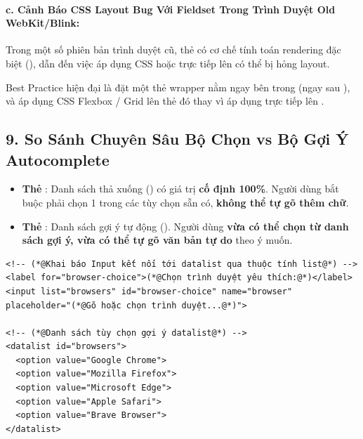 \paragraph{c. Cảnh Báo CSS Layout Bug Với Fieldset Trong Trình Duyệt Old WebKit/Blink:}
Trong một số phiên bản trình duyệt cũ, thẻ  có cơ chế tính toán rendering đặc biệt (), dẫn đến việc áp dụng CSS  hoặc  trực tiếp lên  có thể bị hỏng layout.
\begin{tipBox}
Best Practice hiện đại là đặt một thẻ wrapper  nằm ngay bên trong  (ngay sau ), và áp dụng CSS Flexbox / Grid lên thẻ  đó thay vì áp dụng trực tiếp lên .
\end{tipBox}

\subsection{9. So Sánh Chuyên Sâu Bộ Chọn  vs Bộ Gợi Ý Autocomplete }

\begin{conceptBox}
\begin{itemize}[leftmargin=1.5em, itemsep=3pt, parsep=0pt]
    \item \textbf{Thẻ }: Danh sách thả xuống () có giá trị \textbf{cố định 100\%}. Người dùng bắt buộc phải chọn 1 trong các tùy chọn sẵn có, \textbf{không thể tự gõ thêm chữ}.
    \item \textbf{Thẻ }: Danh sách gợi ý tự động (). Người dùng \textbf{vừa có thể chọn từ danh sách gợi ý, vừa có thể tự gõ văn bản tự do} theo ý muốn.
\end{itemize}
\end{conceptBox}

\begin{codeWindow}
\begin{lstlisting}[language=HTML5]
<!-- (*@Khai báo Input kết nối tới datalist qua thuộc tính list@*) -->
<label for="browser-choice">(*@Chọn trình duyệt yêu thích:@*)</label>
<input list="browsers" id="browser-choice" name="browser" placeholder="(*@Gõ hoặc chọn trình duyệt...@*)">

<!-- (*@Danh sách tùy chọn gợi ý datalist@*) -->
<datalist id="browsers">
  <option value="Google Chrome">
  <option value="Mozilla Firefox">
  <option value="Microsoft Edge">
  <option value="Apple Safari">
  <option value="Brave Browser">
</datalist>
\end{lstlisting}
\end{codeWindow}

